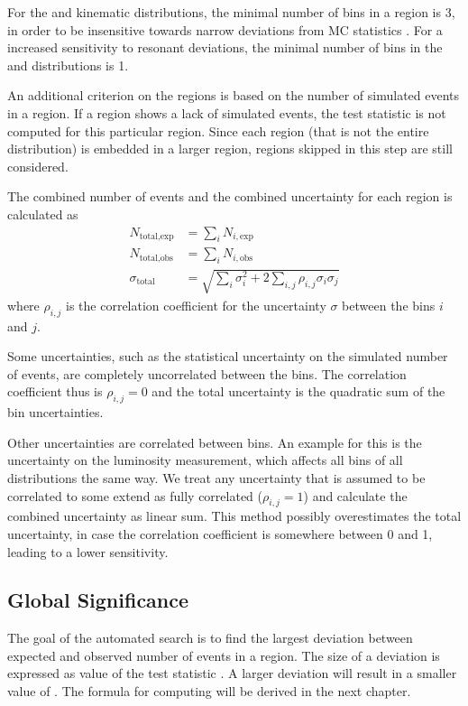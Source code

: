 For the \sumpT and \MET kinematic distributions, the minimal number of bins in a region is \num{3}, in order to be insensitive towards narrow deviations from \ac{MC} statistics .
For a increased sensitivity to resonant deviations, the minimal number of bins in the \Minv and \MT distributions is \num{1}.

An additional criterion on the regions is based on the number of simulated events in a region. If a region shows a lack of simulated events, the test statistic is not computed for this particular region. Since each region (that is not the entire distribution) is embedded in a larger region, regions skipped in this step are still considered. 

The combined number of events and the combined uncertainty for each region is calculated as
\begin{align}
     N_{\text{total},\text{exp}} &= \sum_i N_{i, \text{exp}} \\   
     N_{\text{total},\text{obs}} &= \sum_i N_{i, \text{obs}} \\
     \sigma_\text{total} &= \sqrt{\sum_i \sigma_i^2 + 2 \sum_{i,j} \rho_{i,j}\sigma_i\sigma_j}
\end{align}
where $\rho_{i,j}$ is the correlation coefficient for the uncertainty $\sigma$ between the bins $i$ and $j$.

Some uncertainties, such as the statistical uncertainty on the simulated number of events, are completely uncorrelated between the bins. The correlation coefficient thus is $\rho_{i,j} = 0$ and the total uncertainty is the quadratic sum of the bin uncertainties.

Other uncertainties are correlated between bins. An example for this is the uncertainty on the luminosity measurement, which affects all bins of all distributions the same way. We treat any uncertainty that is assumed to be correlated to some extend as fully correlated ($\rho_{i,j} = 1$) and calculate the combined uncertainty as linear sum. This method possibly overestimates the total uncertainty, in case the correlation coefficient is somewhere between 0 and 1, leading to a lower  sensitivity.

\subsection{Global Significance}
\label{sec:global_significance}

The goal of the automated search is to find the largest deviation between expected and observed number of events in a region. The size of a deviation is expressed as value of the test statistic \TS. A larger deviation will result in a smaller value of \TS.
The formula for computing \TS will be derived in the next chapter. 


